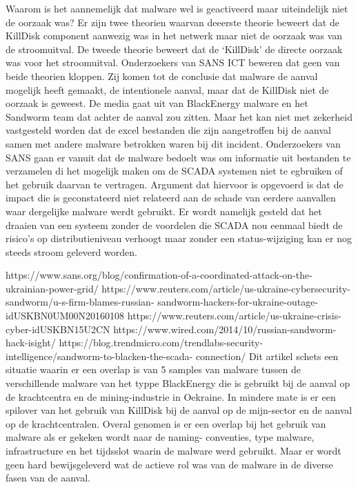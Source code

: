 {Waarom is het aannemelijk dat malware wel is geactiveerd maar uiteindelijk niet de oorzaak was?
Er zijn twee theorien waarvan deeerste theorie beweert dat de KillDisk component aanwezig was in
het netwerk maar niet de oorzaak was van de stroomuitval. De tweede theorie beweert dat de
‘KillDisk’ de directe oorzaak was voor het stroomuitval. Onderzoekers van SANS ICT beweren dat
geen van beide theorien kloppen. Zij komen tot de conclusie dat malware de aanval mogelijk heeft
gemaakt, de intentionele aanval, maar dat de KillDisk niet de oorzaak is geweest. De media gaat uit
van BlackEnergy malware en het Sandworm team dat achter de aanval zou zitten. Maar het kan niet
met zekerheid vastgesteld worden dat de excel bestanden die zijn aangetroffen bij de aanval samen
met andere malware betrokken waren bij dit incident. Onderzoekers van SANS gaan er vanuit dat de
malware bedoelt was om informatie uit bestanden te verzamelen di het mogelijk maken om de
SCADA systemen niet te egbruiken of het gebruik daarvan te vertragen. Argument dat hiervoor is
opgevoerd is dat de impact die is geconstateerd niet relateerd aan de schade van eerdere aanvallen
waar dergelijke malware werdt gebruikt. Er wordt namelijk gesteld dat het draaien van een systeem
zonder de voordelen die SCADA nou eenmaal biedt de risico’s op distributieniveau verhoogt maar
zonder een status-wijziging kan er nog steeds stroom geleverd worden.

https://www.sans.org/blog/confirmation-of-a-coordinated-attack-on-the-ukrainian-power-grid/
https://www.reuters.com/article/us-ukraine-cybersecurity-sandworm/u-s-firm-blames-russian-
sandworm-hackers-for-ukraine-outage-idUSKBN0UM00N20160108
https://www.reuters.com/article/us-ukraine-crisis-cyber-idUSKBN15U2CN
https://www.wired.com/2014/10/russian-sandworm-hack-isight/
https://blog.trendmicro.com/trendlabs-security-intelligence/sandworm-to-blacken-the-scada-
connection/
Dit artikel schets een situatie waarin er een overlap is van 5 samples van malware tussen de
verschillende malware van het typpe BlackEnergy die is gebruikt bij de aanval op de krachtcentra en
de mining-industrie in Oekraine.
In mindere mate is er een spilover van het gebruik van KillDisk bij de aanval op de mijn-sector en de
aanval op de krachtcentralen.
Overal genomen is er een overlap bij het gebruik van malware als er gekeken wordt naar de naming-
conventies, type malware, infrastructure en het tijdsslot waarin de malware werd gebruikt. Maar er
wordt geen hard bewijsgeleverd wat de actieve rol was van de malware in de diverse fasen van de
aanval.

}
